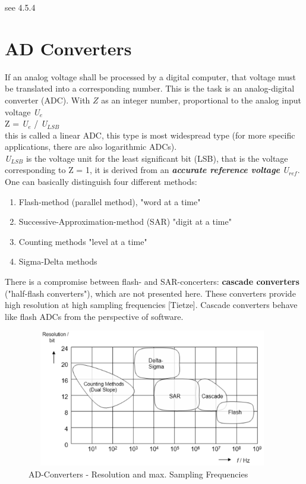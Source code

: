 see 4.5.4

\section{AD Converters}

If an analog voltage shall be processed by a digital computer, that voltage must be translated into a corresponding number. This is the task is an analog-digital converter (ADC). With \textit{$Z$} as an integer number, proportional to the analog input voltage \textit{U}${}_{e}$\\

Z\textit{ }= \textit{U${}_{e}$} / \textit{U}${}_{LSB}$\\

this is called a linear ADC, this type is most widespread type (for more specific applications, there are also logarithmic ADCs).\\

\textit{U${}_{LSB}$} is the voltage unit for the least significant bit (LSB), that is the voltage corresponding to $\mathrm{Z}$ = 1, it is derived from an \textbf{\textit{accurate reference voltage}} \textit{U${}_{ref}$}.\\

One can basically distinguish four different methods:

\begin{enumerate}
\item  Flash-method (parallel method),  "word at a time"
\item  Successive-Approximation-method (SAR) "digit at a time"
\item  Counting methods "level at a time"
\item  Sigma-Delta methods
\end{enumerate}

There is a compromise between flash- and SAR-concerters: \textbf{cascade converters} ("half-flash converters"), which are not presented here. These converters provide high resolution at high sampling frequencies [Tietze]. Cascade converters behave like flash ADCs from the perspective of software.\\
\newpage

    \begin{figure}[h]
    \centering
    \includegraphics[width=11cm, height=6cm]{Images/image174.png}
    \caption{AD-Converters - Resolution and max. Sampling Frequencies}
    \label{fig:Fig 128}
    \end{figure}
    
